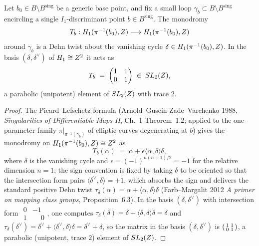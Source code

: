 \begin{proposition}
\label{gluing:prop:picard-lefschetz}
Let $b_0 \in B \setminus B^{\mathrm{sing}}$ be a generic base point, and
fix a small loop $\gamma_b \subset B \setminus B^{\mathrm{sing}}$
encircling a single $I_1$-discriminant point $b \in B^{\mathrm{sing}}$.
The monodromy
\[
 T_b : H_1(\pi^{-1}(b_0), Z) \longrightarrow
 H_1(\pi^{-1}(b_0), Z)
\]
around $\gamma_b$ is a Dehn twist about the vanishing cycle $\delta \in
H_1(\pi^{-1}(b_0), Z)$. In the basis $(\delta, \delta^{\vee})$ of $H_1
\cong Z^2$ it acts as
\[
 T_b \;=\; \begin{pmatrix} 1 & 1 \\ 0 & 1 \end{pmatrix} \;\in\; SL_2(Z),
\]
a parabolic (unipotent) element of $SL_2(Z)$ with trace $2$.
\end{proposition}

\begin{proof}
The Picard--Lefschetz formula (Arnold--Gusein-Zade--Varchenko 1988,
\emph{Singularities of Differentiable Maps II}, Ch.~1 Theorem~1.2;
applied to the one-parameter family $\pi|_{\pi^{-1}(\gamma_b)}$ of
elliptic curves degenerating at $b$) gives the monodromy on
$H_1(\pi^{-1}(b_0), Z) \cong Z^2$ as
\[
 T_b(\alpha) \;=\; \alpha + \epsilon \langle \alpha, \delta \rangle
 \delta,
\]
where $\delta$ is the vanishing cycle and $\epsilon = (-1)^{n(n+1)/2} =
-1$ for the relative dimension $n = 1$; the sign convention is fixed
by taking $\delta$ to be oriented so that the intersection form pairs
$\langle \delta^\vee, \delta \rangle = +1$, which absorbs the sign
and delivers the standard positive Dehn twist $\tau_\delta(\alpha) =
\alpha + \langle \alpha, \delta\rangle \delta$ (Farb--Margalit 2012
\emph{A primer on mapping class groups}, Proposition~6.3).
In the basis $(\delta, \delta^{\vee})$ with intersection form
$\begin{smallmatrix} 0 & -1 \\ 1 & \phantom{-}0 \end{smallmatrix}$,
one computes
$\tau_\delta(\delta) = \delta + \langle \delta, \delta\rangle \delta
= \delta$
and
$\tau_\delta(\delta^{\vee}) = \delta^{\vee} + \langle \delta^{\vee},
\delta\rangle \delta = \delta^{\vee} + \delta$,
so the matrix in the basis $(\delta, \delta^{\vee})$ is
$\begin{psmallmatrix} 1 & 1 \\ 0 & 1 \end{psmallmatrix}$, a
parabolic (unipotent, trace $2$) element of $SL_2(Z)$.
\end{proof}

